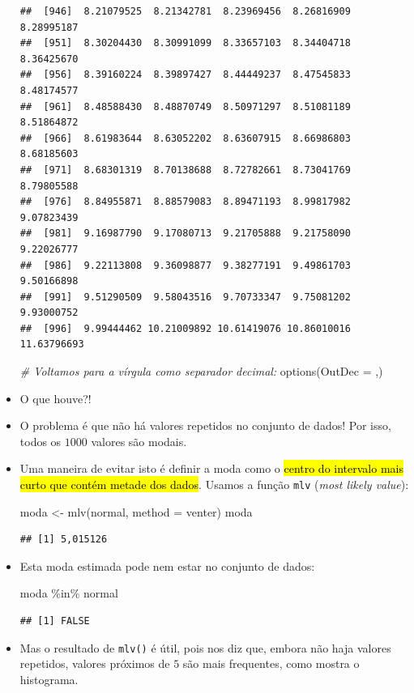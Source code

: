 \documentclass[
  11pt]{report}
\newenvironment{Shaded}{\begin{snugshade}}{\end{snugshade}}
\newcommand{\AttributeTok}[1]{\textcolor[rgb]{0.77,0.63,0.00}{#1}}
\newcommand{\CommentTok}[1]{\textcolor[rgb]{0.56,0.35,0.01}{\textit{#1}}}
\newcommand{\FunctionTok}[1]{\textcolor[rgb]{0.00,0.00,0.00}{#1}}
\newcommand{\NormalTok}[1]{#1}
\newcommand{\OtherTok}[1]{\textcolor[rgb]{0.56,0.35,0.01}{#1}}
\newcommand{\SpecialCharTok}[1]{\textcolor[rgb]{0.00,0.00,0.00}{#1}}
\newcommand{\StringTok}[1]{\textcolor[rgb]{0.31,0.60,0.02}{#1}}
\renewenvironment{Shaded}{
    \begin{mdframed}[%
      roundcorner=2pt,%
      innerleftmargin=5pt,%
      innerrightmargin=5pt,%
      topline=true,%
      leftline=true,%
      rightline=true,%
      bottomline=true,%
      linewidth=0.5pt,%
      linecolor=black!20,%
      backgroundcolor=black!2,%
      skipabove=2ex,%
      skipbelow=2.5ex%
    ]%
  }
  {
    \end{mdframed}
  }
\begin{document}
\begin{itemize}
\begin{verbatim}
##  [946]  8.21079525  8.21342781  8.23969456  8.26816909  8.28995187
##  [951]  8.30204430  8.30991099  8.33657103  8.34404718  8.36425670
##  [956]  8.39160224  8.39897427  8.44449237  8.47545833  8.48174577
##  [961]  8.48588430  8.48870749  8.50971297  8.51081189  8.51864872
##  [966]  8.61983644  8.63052202  8.63607915  8.66986803  8.68185603
##  [971]  8.68301319  8.70138688  8.72782661  8.73041769  8.79805588
##  [976]  8.84955871  8.88579083  8.89471193  8.99817982  9.07823439
##  [981]  9.16987790  9.17080713  9.21705888  9.21758090  9.22026777
##  [986]  9.22113808  9.36098877  9.38277191  9.49861703  9.50166898
##  [991]  9.51290509  9.58043516  9.70733347  9.75081202  9.93000752
##  [996]  9.99444462 10.21009892 10.61419076 10.86010016 11.63796693
\end{verbatim}

\begin{Shaded}
\begin{Highlighting}[]
\CommentTok{\# Voltamos para a vírgula como separador decimal:}
\FunctionTok{options}\NormalTok{(}\AttributeTok{OutDec =} \StringTok{\textquotesingle{},\textquotesingle{}}\NormalTok{)}
\end{Highlighting}
\end{Shaded}
\item
  O que houve?!
\item
  O problema é que não há valores repetidos no conjunto de dados! Por isso, todos os $1000$ valores são modais.
\item
  Uma maneira de evitar isto é definir a moda como o {\hl{centro do intervalo mais curto que contém metade dos dados}}. Usamos a função \texttt{mlv} (\emph{most likely value}):

\begin{Shaded}
\begin{Highlighting}[]
\NormalTok{moda }\OtherTok{\textless{}{-}} \FunctionTok{mlv}\NormalTok{(normal, }\AttributeTok{method =} \StringTok{\textquotesingle{}venter\textquotesingle{}}\NormalTok{)}
\NormalTok{moda}
\end{Highlighting}
\end{Shaded}

\begin{verbatim}
## [1] 5,015126
\end{verbatim}
\item
  Esta moda estimada pode nem estar no conjunto de dados:

\begin{Shaded}
\begin{Highlighting}[]
\NormalTok{moda }\SpecialCharTok{\%in\%}\NormalTok{ normal}
\end{Highlighting}
\end{Shaded}

\begin{verbatim}
## [1] FALSE
\end{verbatim}
\item
  Mas o resultado de \texttt{mlv()} é útil, pois nos diz que, embora não haja valores repetidos, valores próximos de $5$ são mais frequentes, como mostra o histograma.
\end{itemize}
\end{document}
